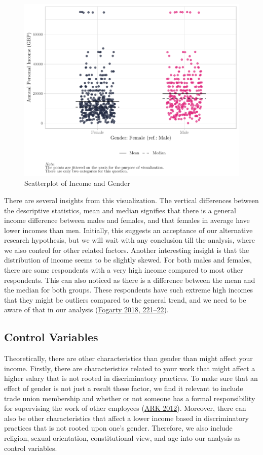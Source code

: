 \documentclass[
]{article}
\begin{document}
\begin{figure}[H]

{\centering \includegraphics[width=0.8\linewidth]{paper_files/figure-latex/unnamed-chunk-2-1} 

}

\caption{Scatterplot of Income and Gender}\label{fig:unnamed-chunk-2}
\end{figure}

There are several insights from this visualization. The vertical
differences between the descriptive statistics, mean and median
signifies that there is a general income difference between males and
females, and that females in average have lower incomes than men.
Initially, this suggests an acceptance of our alternative research
hypothesis, but we will wait with any conclusion till the analysis,
where we also control for other related factors. Another interesting
insight is that the distribution of income seems to be slightly skewed.
For both males and females, there are some respondents with a very high
income compared to most other respondents. This can also noticed as
there is a difference between the mean and the median for both groups.
These respondents have such extreme high incomes that they might be
outliers compared to the general trend, and we need to be aware of that
in our analysis (\protect\hyperlink{ref-fogarty2018quantitative}{Fogarty
2018, 221--22}).

\hypertarget{control-variables}{%
\subsection{Control Variables}\label{control-variables}}

Theoretically, there are other characteristics than gender than might
affect your income. Firstly, there are characteristics related to your
work that might affect a higher salary that is not rooted in
discriminatory practices. To make sure that an effect of gender is not
just a result these factor, we find it relevant to include trade union
membership and whether or not someone has a formal responsibility for
supervising the work of other employees
(\protect\hyperlink{ref-ark_2012}{ARK 2012}). Moreover, there can also
be other characteristics that affect a lower income based in
discriminatory practices that is not rooted upon one's gender.
Therefore, we also include religion, sexual orientation, constitutional
view, and age into our analysis as control variables.
\end{document}
